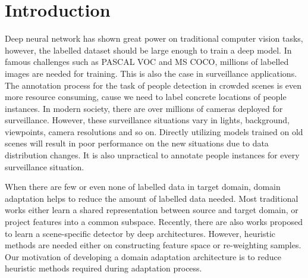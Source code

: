 \documentclass[runningheads]{llncs}
\begin{document}
\section{Introduction}

Deep neural network has shown great power on traditional computer vision tasks, however, the labelled dataset should be large enough to train a deep model. In famous challenges such as PASCAL VOC and MS COCO, millions of labelled images are needed for training. This is also the case in surveillance applications. The annotation process for the task of people detection in crowded scenes is even more resource consuming, cause we need to label concrete locations of people instances. In modern society, there are over millions of cameras deployed for surveillance. However, these surveillance situations vary in lights, background, viewpoints, camera resolutions and so on. Directly utilizing models trained on old scenes will result in poor performance on the new situations due to data distribution changes. It is also unpractical to annotate people instances for every surveillance situation.

When there are few or even none of labelled data in target domain, domain adaptation helps to reduce the amount of labelled data needed. Most traditional works \cite{saenko2010adapting,kulis2011you,gopalan2011domain,huang2006correcting,gretton2009covariate} either learn a shared representation between source and target domain, or project features into a common subspace. Recently, there are also works \cite{wang2014scene,zeng2014deep,hattori2015learning} proposed to learn a scene-specific detector by deep architectures. However, heuristic methods are needed either on constructing feature space or re-weighting samples. Our motivation of developing a domain adaptation architecture is to reduce heuristic methods required during adaptation process.
\end{document}
